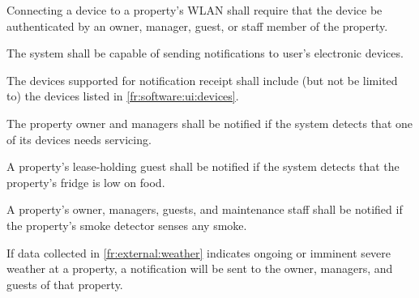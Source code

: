 \documentclass[letter,titlepage,oneside,english]{report}
\begin{document}
\begin{fr}
\begin{fr}
    Connecting a device to a property's WLAN shall require that the device be authenticated by an owner, manager, guest, or staff member of the property.
  \end{fr}
\item
  The system shall be capable of sending notifications to user's electronic devices.
  \begin{fr}
  \item
    The devices supported for notification receipt shall include (but not be limited to) the devices listed in \ref{fr:software:ui:devices}.
  \item
    The property owner and managers shall be notified if the system detects that one of its devices needs servicing.
  \item
    A property's lease-holding guest shall be notified if the system detects that the property's fridge is low on food.
  \item
    A property's owner, managers, guests, and maintenance staff shall be notified if the property's smoke detector senses any smoke.
  \item
    If data collected in \ref{fr:external:weather} indicates ongoing or imminent severe weather at a property, a notification will be sent to the owner, managers, and guests of that property.
  \end{fr}
\end{fr}
\end{document}
